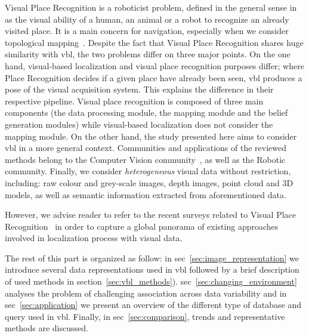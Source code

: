 		Visual Place Recognition is a roboticist problem, defined in the general sense in~\citep{Lowry2016} as the visual ability of a human, an animal or a robot to recognize an already visited place. It is a main concern for navigation, especially when we consider topological mapping~\citep{Garcia-Fidalgo2015}. Despite the fact that Visual Place Recognition shares huge similarity with \ac{vbl}, the two problems differ on three major points. On the one hand, visual-based localization and visual place recognition purposes differ; where Place Recognition decides if a given place have already been seen, \ac{vbl} produces a pose of the visual acquisition system. This explains the difference in their respective pipeline. Visual place recognition is composed of three main components (the data processing module, the mapping module and the belief generation modules) while visual-based localization does not consider the mapping module. On the other hand, the study presented here aims to consider \ac{vbl} in a more general context. Communities and applications of the reviewed methods belong to the Computer Vision community~\citep{Sattler2011}, as well as the Robotic~\citep{Garcia-Fidalgo2015} community. Finally, we consider \textit{heterogeneous} visual data without restriction, including: raw colour and grey-scale images, depth images, point cloud and 3D models, as well as semantic information extracted from aforementioned data. 
	
		However, we advise reader to refer to the recent surveys related to Visual Place Recognition~\citep{Lowry2016,Garcia-Fidalgo2015,Kostavelis2015} in order to capture a global panorama of existing approaches involved in localization process with visual data.		

		\bigskip
		The rest of this part is organized as follow: in \acl*{sec}~\ref{sec:image_representation} we introduce several data representations used in \ac{vbl} followed by a brief description of used methods in section~\ref{sec:vbl_methods}).  \acs{sec}~\ref{sec:changing_environment} analyses the problem of challenging association across data variability and in  \acl{sec}~\ref{sec:application} we present an overview of the different type of database and query used in \ac{vbl}. Finally, in  \acl{sec}~\ref{sec:comparison}, trends and representative methods are discussed.